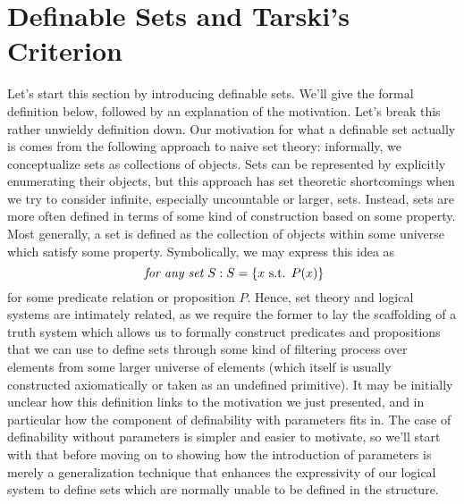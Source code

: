\documentclass{article}
\begin{document}
\section{Definable Sets and Tarski's Criterion}
Let's start this section by introducing definable sets. We'll give the formal definition below, followed by an explanation of the motivation.
\n
Let's break this rather unwieldy definition down. Our motivation for what a definable set actually is comes from the following approach to naive set theory: informally, we conceptualize sets as collections of objects. Sets can be represented by explicitly enumerating their objects, but this approach has set theoretic shortcomings when we try to consider infinite, especially uncountable or larger, sets. Instead, sets are more often defined in terms of some kind of construction based on some property. Most generally, a set is defined as the collection of objects within some universe which satisfy some property. Symbolically, we may express this idea as
    $$ \textit{ for any set $ S $}: S = \{ x \textnormal{ s.t. } P(x) \} $$
for some predicate relation or proposition $ P $. Hence, set theory and logical systems are intimately related, as we require the former to lay the scaffolding of a truth system which allows us to formally construct predicates and propositions that we can use to define sets through some kind of filtering process over elements from some larger universe of elements (which itself is usually constructed axiomatically or taken as an undefined primitive). It may be initially unclear how this definition links to the motivation we just presented, and in particular how the component of definability with parameters fits in. The case of definability without parameters is simpler and easier to motivate, so we'll start with that before moving on to showing how the introduction of parameters is merely a generalization technique that enhances the expressivity of our logical system to define sets which are normally unable to be defined in the structure.
\end{document}
